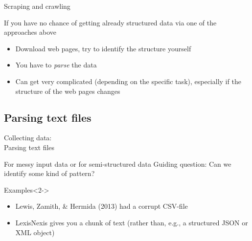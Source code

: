 \documentclass{beamer}
\begin{document}
\begin{frame}{Scraping and crawling}
\begin{block}{If you have no chance of getting already structured data via one of the approaches above}
\begin{itemize}
\item<2->Download web pages, try to identify the structure yourself
\item<2->You have to \emph{parse} the data
\item<3-> Can get very complicated (depending on the specific task), especially if the structure of the web pages changes
\end{itemize}
\end{block}
\end{frame}

		
\subsection{Parsing text files}
\begin{frame}
Collecting data:\\
Parsing text files
\end{frame}

\begin{frame}{For messy input data or for semi-structured data}
Guiding question: Can we identify some kind of pattern?
\begin{block}{Examples}<2->
\begin{itemize}
\item<2-> Lewis, Zamith, \& Hermida (2013) had a corrupt CSV-file
\item<3-> LexisNexis gives you a chunk of text (rather than, e.g., a structured JSON or XML object)
\end{itemize}
\end{block}
~\\

\end{frame}
\end{document}
